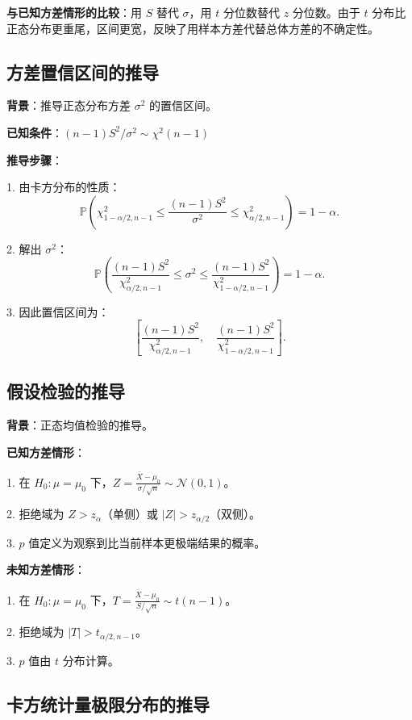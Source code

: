 \textbf{与已知方差情形的比较}：用 $S$ 替代 $\sigma$，用 $t$ 分位数替代 $z$ 分位数。由于 $t$ 分布比正态分布更重尾，区间更宽，反映了用样本方差代替总体方差的不确定性。

\subsection{方差置信区间的推导}\label{sec:derivation-variance-ci}

\textbf{背景}：推导正态分布方差 $\sigma^2$ 的置信区间。

\textbf{已知条件}：$(n-1)S^2/\sigma^2 \sim \chi^2(n-1)$

\textbf{推导步骤}：

1. 由卡方分布的性质：
\[
\mathbb{P}\left(\chi^2_{1-\alpha/2,n-1} \leq \frac{(n-1)S^2}{\sigma^2} \leq \chi^2_{\alpha/2,n-1}\right) = 1-\alpha.
\]

2. 解出 $\sigma^2$：
\[
\mathbb{P}\left(\frac{(n-1)S^2}{\chi^2_{\alpha/2,n-1}} \leq \sigma^2 \leq \frac{(n-1)S^2}{\chi^2_{1-\alpha/2,n-1}}\right) = 1-\alpha.
\]

3. 因此置信区间为：
\[
\left[ \frac{(n-1)S^2}{\chi^2_{\alpha/2,n-1}},\quad \frac{(n-1)S^2}{\chi^2_{1-\alpha/2,n-1}} \right].
\]

\subsection{假设检验的推导}\label{sec:derivation-hypothesis-testing}

\textbf{背景}：正态均值检验的推导。

\textbf{已知方差情形}：

1. 在 $H_0: \mu = \mu_0$ 下，$Z = \frac{\bar{X} - \mu_0}{\sigma/\sqrt{n}} \sim \mathcal{N}(0,1)$。

2. 拒绝域为 $Z > z_\alpha$（单侧）或 $|Z| > z_{\alpha/2}$（双侧）。

3. $p$ 值定义为观察到比当前样本更极端结果的概率。

\textbf{未知方差情形}：

1. 在 $H_0: \mu = \mu_0$ 下，$T = \frac{\bar{X} - \mu_0}{S/\sqrt{n}} \sim t(n-1)$。

2. 拒绝域为 $|T| > t_{\alpha/2,n-1}$。

3. $p$ 值由 $t$ 分布计算。

\subsection{卡方统计量极限分布的推导}\label{sec:derivation-chi-square}

